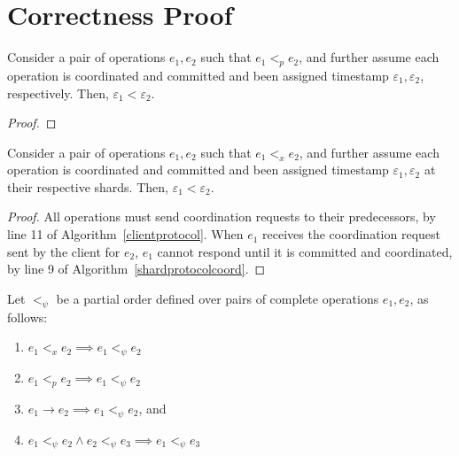 \section{Correctness Proof}
\label{sec:correctness}


\begin{lem}
\label{lemma1}
Consider a pair of operations $e_1, e_2$ such that $e_1 <_p e_2$, and further assume each operation is coordinated and committed and been assigned timestamp $\varepsilon_1, \varepsilon_2$, respectively. Then, $\varepsilon_1 < \varepsilon_2$.
\end{lem}
\begin{proof}
\end{proof}

\begin{lem}
\label{lemma2}
Consider a pair of operations $e_1, e_2$ such that $e_1 <_x e_2$, and further assume each operation is coordinated and committed and been assigned timestamp $\varepsilon_1, \varepsilon_2$ at their respective shards. Then, $\varepsilon_1 < \varepsilon_2$.
\end{lem}
\begin{proof}
All operations must send coordination requests to their predecessors, by line 11 of Algorithm~\ref{clientprotocol}. When $e_1$ receives the coordination request sent by the client for $e_2$, $e_1$ cannot respond until it is committed and coordinated, by line 9 of Algorithm~\ref{shardprotocolcoord}.


\end{proof}


Let $<_\psi$ be a partial order defined over pairs of complete operations $e_1, e_2$, as follows:
\begin{enumerate}
    \item $e_1 <_x e_2 \implies e_1 <_\psi e_2$
    \item $e_1 <_p e_2 \implies e_1 <_\psi e_2$
    \item $e_1 \rightarrow e_2 \implies e_1 <_\psi e_2$, and
    \item $e_1 <_\psi e_2 \land e_2 <_\psi e_3 \implies e_1 <_\psi e_3$
\end{enumerate}

